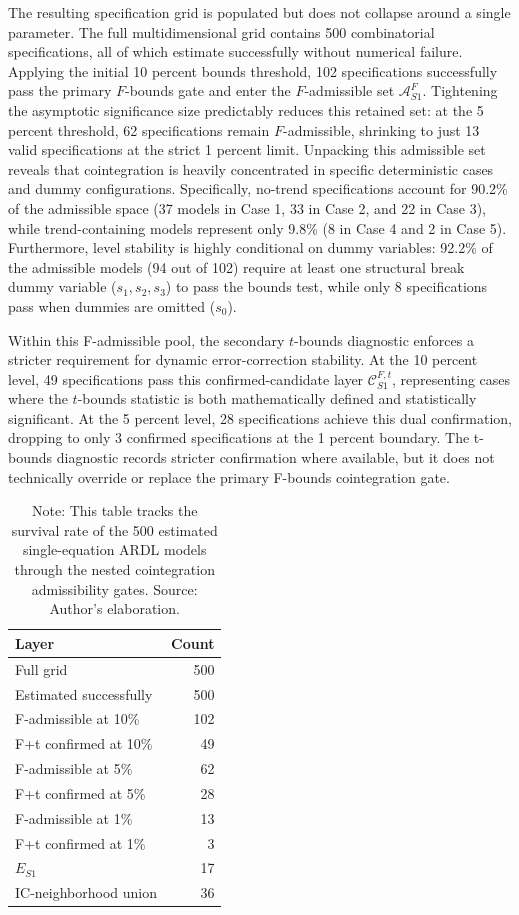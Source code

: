 \documentclass[11pt]{article}
\begin{document}
The resulting specification grid is populated but does not collapse around a single parameter. The full multidimensional grid contains 500 combinatorial specifications, all of which estimate successfully without numerical failure. Applying the initial 10 percent bounds threshold, 102 specifications successfully pass the primary \(F\)-bounds gate and enter the \(F\)-admissible set \(\mathcal{A}^{F}_{S1}\). Tightening the asymptotic significance size predictably reduces this retained set: at the 5 percent threshold, 62 specifications remain \(F\)-admissible, shrinking to just 13 valid specifications at the strict 1 percent limit. Unpacking this admissible set reveals that cointegration is heavily concentrated in specific deterministic cases and dummy configurations. Specifically, no-trend specifications account for 90.2\% of the admissible space (37 models in Case 1, 33 in Case 2, and 22 in Case 3), while trend-containing models represent only 9.8\% (8 in Case 4 and 2 in Case 5). Furthermore, level stability is highly conditional on dummy variables: 92.2\% of the admissible models (94 out of 102) require at least one structural break dummy variable ($s_1, s_2, s_3$) to pass the bounds test, while only 8 specifications pass when dummies are omitted ($s_0$).

Within this F-admissible pool, the secondary \(t\)-bounds diagnostic enforces a stricter requirement for dynamic error-correction stability. At the 10 percent level, 49 specifications pass this confirmed-candidate layer \(\mathcal{C}^{F,t}_{S1}\), representing cases where the \(t\)-bounds statistic is both mathematically defined and statistically significant. At the 5 percent level, 28 specifications achieve this dual confirmation, dropping to only 3 confirmed specifications at the 1 percent boundary. The t-bounds diagnostic records stricter confirmation where available, but it does not technically override or replace the primary F-bounds cointegration gate.

\begin{table}[H]
\centering
\caption{S1 Shrinking Specification Space Counts}
\label{tab:s1_shrinking_space_counts}
\small
\begin{tabular}{lr}
\toprule
Layer & Count \\
\midrule
\midrule
Full grid & 500 \\
Estimated successfully & 500 \\
F-admissible at 10\% & 102 \\
F+t confirmed at 10\% & 49 \\
F-admissible at 5\% & 62 \\
F+t confirmed at 5\% & 28 \\
F-admissible at 1\% & 13 \\
F+t confirmed at 1\% & 3 \\
$E_{S1}$ & 17 \\
IC-neighborhood union & 36 \\
\bottomrule
\end{tabular}
\caption*{Note: This table tracks the survival rate of the 500 estimated single-equation ARDL models through the nested cointegration admissibility gates. Source: Author's elaboration.}
\end{table}
\end{document}
